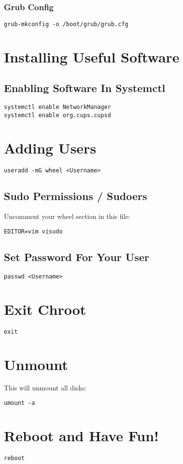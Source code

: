\documentclass[12pt]{article}
\begin{document}
\subsubsection{Grub Config}
\begin{verbatim}
grub-mkconfig -o /boot/grub/grub.cfg
\end{verbatim}

\section{Installing Useful Software}
\noindent{}

\subsection{Enabling Software In Systemctl}
\begin{verbatim}
systemctl enable NetworkManager
systemctl enable org.cups.cupsd
\end{verbatim}

\section{Adding Users}

\begin{verbatim}
useradd -mG wheel <Username>
\end{verbatim}

\subsection{Sudo Permissions / Sudoers}
Uncomment your wheel section in this file:
\begin{verbatim}
EDITOR=vim visudo
\end{verbatim}

\subsection{Set Password For Your User}
\begin{verbatim}
passwd <Username>
\end{verbatim}

\section{Exit Chroot}
\begin{verbatim}
exit
\end{verbatim}

\section{Unmount}
This will unmount all disks:
\begin{verbatim}
umount -a
\end{verbatim}

\section{Reboot and Have Fun!}
\begin{verbatim}
reboot
\end{verbatim}
\end{document}
